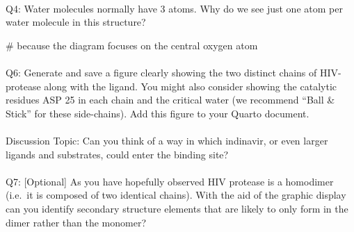 \documentclass[
  letterpaper,
  DIV=11,
  numbers=noendperiod]{scrartcl}
\makeatletter
\let\oldparagraph\paragraph
\renewcommand{\paragraph}{
    \@ifstar
      \xxxParagraphStar
      \xxxParagraphNoStar
  }
\newcommand{\xxxParagraphStar}[1]{\oldparagraph*{#1}\mbox{}}
\newcommand{\xxxParagraphNoStar}[1]{\oldparagraph{#1}\mbox{}}
\newenvironment{Shaded}{\begin{snugshade}}{\end{snugshade}}
\newcommand{\CommentTok}[1]{\textcolor[rgb]{0.37,0.37,0.37}{#1}}
\makeatother
\begin{document}
\paragraph{Q4: Water molecules normally have 3 atoms. Why do we see just
one atom per water molecule in this
structure?}\label{q4-water-molecules-normally-have-3-atoms.-why-do-we-see-just-one-atom-per-water-molecule-in-this-structure}

\begin{Shaded}
\begin{Highlighting}[]
\CommentTok{\# because the diagram focuses on the central oxygen atom}
\end{Highlighting}
\end{Shaded}

\paragraph{Q6: Generate and save a figure clearly showing the two
distinct chains of HIV-protease along with the ligand. You might also
consider showing the catalytic residues ASP 25 in each chain and the
critical water (we recommend ``Ball \& Stick'' for these side-chains).
Add this figure to your Quarto
document.}\label{q6-generate-and-save-a-figure-clearly-showing-the-two-distinct-chains-of-hiv-protease-along-with-the-ligand.-you-might-also-consider-showing-the-catalytic-residues-asp-25-in-each-chain-and-the-critical-water-we-recommend-ball-stick-for-these-side-chains.-add-this-figure-to-your-quarto-document.}

\paragraph{Discussion Topic: Can you think of a way in which indinavir,
or even larger ligands and substrates, could enter the binding
site?}\label{discussion-topic-can-you-think-of-a-way-in-which-indinavir-or-even-larger-ligands-and-substrates-could-enter-the-binding-site}

\paragraph{Q7: {[}Optional{]} As you have hopefully observed HIV
protease is a homodimer (i.e.~it is composed of two identical chains).
With the aid of the graphic display can you identify secondary structure
elements that are likely to only form in the dimer rather than the
monomer?}\label{q7-optional-as-you-have-hopefully-observed-hiv-protease-is-a-homodimer-i.e.-it-is-composed-of-two-identical-chains.-with-the-aid-of-the-graphic-display-can-you-identify-secondary-structure-elements-that-are-likely-to-only-form-in-the-dimer-rather-than-the-monomer}
\end{document}
